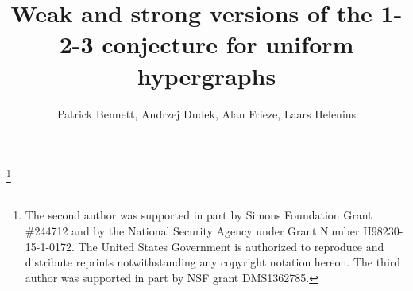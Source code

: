 \documentclass[12pt,reqno]{amsart}
\begin{document}
\newtheorem{theorem}{Theorem}[section]
\newtheorem{lemma}[theorem]{Lemma}
\newtheorem{definition}[theorem]{Definition}
\newtheorem{conjecture}[theorem]{Conjecture}
\newtheorem{proposition}[theorem]{Proposition}
\newtheorem{claim}[theorem]{Claim}
\newtheorem{corollary}[theorem]{Corollary}
\newtheorem{observation}[theorem]{Observation}
\newtheorem{problem}[theorem]{Open Problem}

\newtheorem*{ineq}{\textbf{Inequalities}}

\newtheorem*{c0}{\textbf{Markov Bound}}
\newtheorem*{c1}{\textbf{Chernoff's Bound}}
\newtheorem*{c2}{\textbf{First Moment Method}}
\newtheorem*{c3}{\textbf{Bernstein's Bound}}
\newtheorem*{c4}{\textbf{Second Moment Method}}
\newtheorem*{c5}{\textbf{Method of Moments}}
\newtheorem*{ub}{\textbf{Union Bound}}
\newtheorem*{bc}{\textbf{Binomial Coefficients Approximation}}
\newtheorem*{123conj}{\textbf{1-2-3 Conjecture}}


\theoremstyle{remark}
\newtheorem{rem}[theorem]{Remark}

\newcommand{\weighted}[1]{\mbox{2-WEIGHTED}^{{(#1)}}}
\newcommand{\Whp}{{\textit{W.h.p. }}}
\newcommand{\whp}{{\textit{w.h.p. }}}
\newcommand{\bin}{\textrm{Bin}}
\newcommand{\po}{\textrm{Po}}
\newcommand{\codeg}{\textrm{codeg}}
\newcommand{\E}{\mathrm{E}}
\newcommand{\V}{\mathrm{Var}}
\newcommand{\RT}{\textup{\textbf{RT}}}
\newcommand{\f}{\textup{\textbf{f}}}
\newcommand{\z}{\textrm{\textbf{z}}}
\newcommand{\ex}{\textrm{\textbf{ex}}}
\newcommand{\sqbs}[1]{\left[ #1 \right]}
\newcommand{\of}[1]{\left( #1 \right)}
\newcommand{\bfrac}[2]{\of{\frac{#1}{#2}}}
\renewcommand{\l}{\ell}
\newcommand{\sm}{\setminus}
\newcommand{\mc}[1]{\mathcal{#1}}
\newcommand{\h}[1]{\mathbb{H}^{({#1})}}
\newcommand{\hh}{\mathbb{H}}
\newcommand{\g}{\mathbb{G}}

\title[]{Weak and strong versions of the 1-2-3 conjecture  for uniform hypergraphs}

\author{Patrick Bennett, Andrzej Dudek, Alan Frieze, Laars Helenius}
\address[Andrzej Dudek, Patrick Bennett and Laars Helenius]{Department of Mathematics, Western Michigan University, Kalamazoo, MI}
\address[Alan Frieze]{Department of Mathematical Sciences, Carnegie Mellon University, Pittsburgh, PA}
\thanks{The second author was supported in part by Simons Foundation Grant \#244712 and by the National Security Agency under Grant Number H98230-15-1-0172. The United States Government is authorized to reproduce and distribute reprints notwithstanding any copyright notation hereon. The third author was supported in part by NSF grant DMS1362785.}
\end{document}
